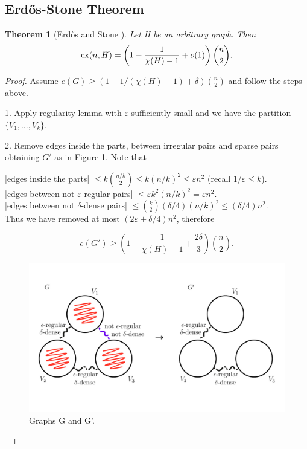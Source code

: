 \documentclass[12pt,twoside,a4paper,bibliography=totocnumbered]{book}
\numberwithin{equation}{section}
\newtheorem{theorem}             {Theorem}[section]
\theoremstyle{remark}
\def\ex{\mathop{\text{\rm ex}}\nolimits}
\begin{document}
\subsection{Erd\H{o}s-Stone Theorem}

\begin{theorem}[{Erd\H{o}s and Stone \cite{ErSt46}}] Let H be an arbitrary graph. Then
$$ \ex(n,H) = \left(1-\frac{1}{\chi (H)-1} + o(1)\right) \binom{n}{2}.$$ 
\end{theorem}

\begin{proof}


Assume $e(G) \geq (1 - 1/(\chi(H) - 1) + \delta)\binom{n}{2}$ and follow the steps above.

1. Apply regularity lemma with $\varepsilon$ sufficiently small and we have the partition $\{V_1, \ldots , V_k\}$.

2. Remove edges inside the parts, between irregular pairs and sparse pairs obtaining $G'$ as in Figure \ref{fig:graph-G-and-G'}.
Note that

|edges inside the parts| $\leq k\binom{n/k}{2} \leq k(n/k)^2 \leq \varepsilon n^2$ (recall $1/\varepsilon \leq k$).\\

|edges between not $\varepsilon$-regular pairs| $\leq \varepsilon k^2 (n/k)^2 = \varepsilon n^2$.\\

|edges between not $\delta$-dense pairs| $\leq \binom{k}{2}(\delta/4) (n/k)^2 \leq (\delta /4)n^2$.\\ 

Thus we have removed at most $(2\varepsilon + \delta/4)n^2$, therefore 

$$ e(G') \geq  \left( 1 - \frac{1}{\chi(H) - 1} + \frac{2 \delta}{3}\right) \binom{n}{2}.$$

\begin{figure}[H]
     \centering
     \includegraphics[scale=1.5]{Figuras/graph-G-and-G'.jpg}
     \caption{Graphs G and G'.}
     \label{fig:graph-G-and-G'}
\end{figure}


\end{proof}
\end{document}
